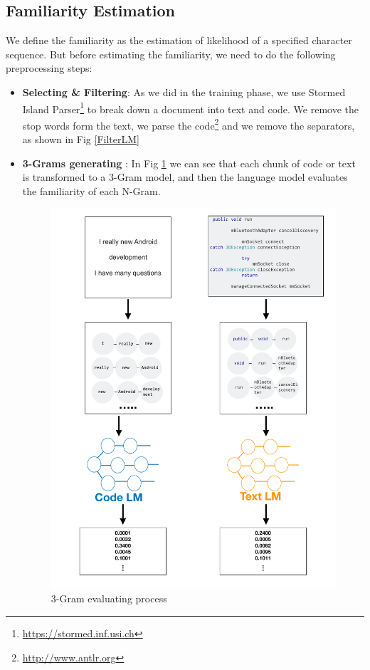\documentclass[12pt,mscthesis]{usiinfthesis}
\begin{document}
	\subsection{Familiarity Estimation}
	We define the familiarity as the estimation of likelihood of a specified character sequence. But before estimating the familiarity, we need to do the following preprocessing steps:
	\begin{itemize}
		\item \textbf{Selecting \& Filtering}: As we did in the training phase, we use Stormed Island Parser\footnote{\url{https://stormed.inf.usi.ch}} \cite{Ponz2015a} to break down a document into text and code. We remove the stop words form the text, we parse the code\footnote{\url{http://www.antlr.org}} and we remove the separators, as shown in Fig \ref{FilterLM}
		\item \textbf{3-Grams generating }: In Fig \ref{3gram-evaluating} we can see that each chunk of code or text is transformed to a 3-Gram model, and then the language model evaluates the familiarity of each N-Gram.
			

			\begin{figure}[htbp]
			\centering
			\includegraphics[width=\textwidth]{3gram-evaluating}
			\caption{3-Gram evaluating process}
			\label{3gram-evaluating}
			\end{figure}	
	

\end{itemize}
\end{document}
